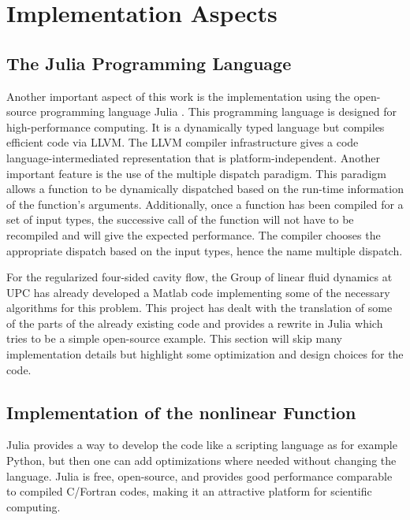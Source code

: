 
\section{Implementation Aspects}

\subsection{The Julia Programming Language}

Another important aspect of this work is the implementation using the
open-source programming language Julia \citep{bezanson2017}. This programming
language is designed for high-performance computing. It is a dynamically typed
language but compiles efficient code via LLVM. The LLVM compiler infrastructure
gives a code language-intermediated representation that is
platform-independent. Another important feature is the use of the multiple
dispatch paradigm. This paradigm allows a function to be dynamically dispatched
based on the run-time information of the function's arguments. Additionally,
once a function has been compiled for a set of input types, the successive call
of the function will not have to be recompiled and will give the expected
performance. The compiler chooses the appropriate dispatch based on the input
types, hence the name multiple dispatch.

For the regularized four-sided cavity flow, the Group of linear fluid
dynamics at UPC has already developed a Matlab code implementing some
of the necessary algorithms for this problem. This project has dealt with the
translation of some of the parts of the already existing code and provides a
rewrite in Julia which tries to be a simple open-source example. This section
will skip many implementation details but highlight some optimization and
design choices for the code.

\subsection{Implementation of the nonlinear Function}

Julia provides a way to develop the code like a scripting language as for
example Python, but then one can add optimizations where needed without
changing the language. Julia is free, open-source, and provides good
performance comparable to compiled C/Fortran codes, making it an attractive
platform for scientific computing. 

